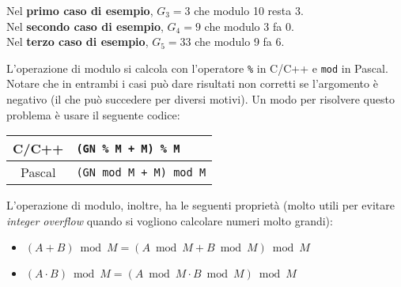 \Examples
\begin{example}
%
\end{example}
\begin{example}
%
\end{example}
\begin{example}
%
\end{example}


\Explanation
Nel \textbf{primo caso di esempio}, $G_3 = 3$ che modulo 10 resta 3.\\[2mm]
Nel \textbf{secondo caso di esempio}, $G_4 = 9$ che modulo 3 fa 0.\\[2mm]
Nel \textbf{terzo caso di esempio}, $G_5 = 33$ che modulo 9 fa 6.


\Notes
L'operazione di modulo si calcola con l'operatore \texttt{\%} in C/C++ e \texttt{mod} in Pascal. Notare che in entrambi i casi può dare risultati non corretti se l'argomento è negativo (il che può succedere per diversi motivi). Un modo per risolvere questo problema è usare il seguente codice:
\begin{center}\begin{tabularx}{\textwidth}{|c|X|}
\hline
C/C++  & \texttt{(GN \% M + M) \% M}\\
\hline
Pascal & \texttt{(GN mod M + M) mod M}\\
\hline
\end{tabularx}\end{center}
L'operazione di modulo, inoltre, ha le seguenti proprietà (molto utili per evitare \emph{integer overflow} quando si vogliono calcolare numeri molto grandi):
\begin{itemize}[nolistsep]
	\item $(A + B) \bmod M = (A \bmod M + B \bmod M) \bmod M$
	\item $(A \cdot B) \bmod M = (A \bmod M \cdot B \bmod M) \bmod M$
\end{itemize}
